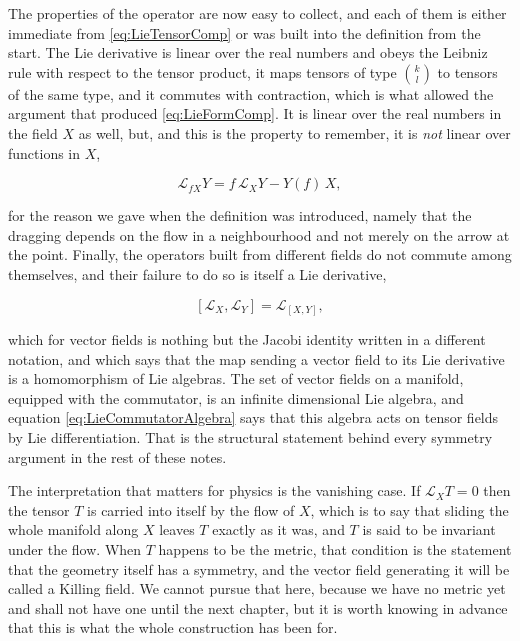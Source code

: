         The properties of the operator are now easy to collect, and each of them is either immediate from \ref{eq:LieTensorComp} or was built into the definition from the start. The Lie derivative is linear over the real numbers and obeys the Leibniz rule with respect to the tensor product, it maps tensors of type $\binom{k}{l}$ to tensors of the same type, and it commutes with contraction, which is what allowed the argument that produced \ref{eq:LieFormComp}. It is linear over the real numbers in the field $X$ as well, but, and this is the property to remember, it is \textit{not} linear over functions in $X$,

        \begin{equation}\label{eq:LieNotFLinear}
            \mathcal{L}_{fX}Y = f\,\mathcal{L}_XY - Y(f)\,X,
        \end{equation}

        for the reason we gave when the definition was introduced, namely that the dragging depends on the flow in a neighbourhood and not merely on the arrow at the point. Finally, the operators built from different fields do not commute among themselves, and their failure to do so is itself a Lie derivative,

        \begin{equation}\label{eq:LieCommutatorAlgebra}
            \left[\mathcal{L}_X,\mathcal{L}_Y\right] = \mathcal{L}_{[X,Y]},
        \end{equation}

        which for vector fields is nothing but the Jacobi identity written in a different notation, and which says that the map sending a vector field to its Lie derivative is a homomorphism of Lie algebras. The set of vector fields on a manifold, equipped with the commutator, is an infinite dimensional Lie algebra, and equation \ref{eq:LieCommutatorAlgebra} says that this algebra acts on tensor fields by Lie differentiation. That is the structural statement behind every symmetry argument in the rest of these notes.

        The interpretation that matters for physics is the vanishing case. If $\mathcal{L}_XT=0$ then the tensor $T$ is carried into itself by the flow of $X$, which is to say that sliding the whole manifold along $X$ leaves $T$ exactly as it was, and $T$ is said to be invariant under the flow. When $T$ happens to be the metric, that condition is the statement that the geometry itself has a symmetry, and the vector field generating it will be called a Killing field. We cannot pursue that here, because we have no metric yet and shall not have one until the next chapter, but it is worth knowing in advance that this is what the whole construction has been for.
